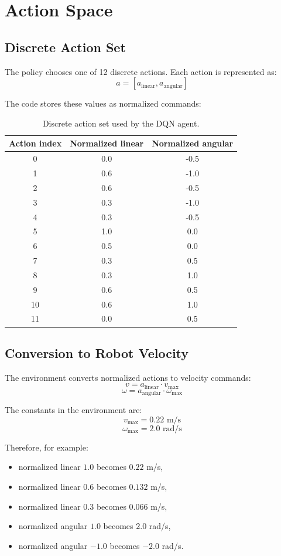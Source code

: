 \documentclass[11pt,a4paper]{article}
\begin{document}
\section{Action Space}

\subsection{Discrete Action Set}

The policy chooses one of 12 discrete actions. Each action is represented as:
\[
    a = [a_{\text{linear}}, a_{\text{angular}}]
\]

The code stores these values as normalized commands:

\begin{table}[h]
\centering
\begin{tabular}{ccc}
\toprule
\textbf{Action index} & \textbf{Normalized linear} & \textbf{Normalized angular} \\
\midrule
0 & 0.0 & -0.5 \\
1 & 0.6 & -1.0 \\
2 & 0.6 & -0.5 \\
3 & 0.3 & -1.0 \\
4 & 0.3 & -0.5 \\
5 & 1.0 & 0.0 \\
6 & 0.5 & 0.0 \\
7 & 0.3 & 0.5 \\
8 & 0.3 & 1.0 \\
9 & 0.6 & 0.5 \\
10 & 0.6 & 1.0 \\
11 & 0.0 & 0.5 \\
\bottomrule
\end{tabular}
\caption{Discrete action set used by the DQN agent.}
\end{table}

\subsection{Conversion to Robot Velocity}

The environment converts normalized actions to velocity commands:
\[
    v = a_{\text{linear}} \cdot v_{\max}
\]
\[
    \omega = a_{\text{angular}} \cdot \omega_{\max}
\]

The constants in the environment are:
\[
    v_{\max} = 0.22 \text{ m/s}
\]
\[
    \omega_{\max} = 2.0 \text{ rad/s}
\]

Therefore, for example:
\begin{itemize}[noitemsep]
    \item normalized linear $1.0$ becomes $0.22$ m/s,
    \item normalized linear $0.6$ becomes $0.132$ m/s,
    \item normalized linear $0.3$ becomes $0.066$ m/s,
    \item normalized angular $1.0$ becomes $2.0$ rad/s,
    \item normalized angular $-1.0$ becomes $-2.0$ rad/s.
\end{itemize}
\end{document}
